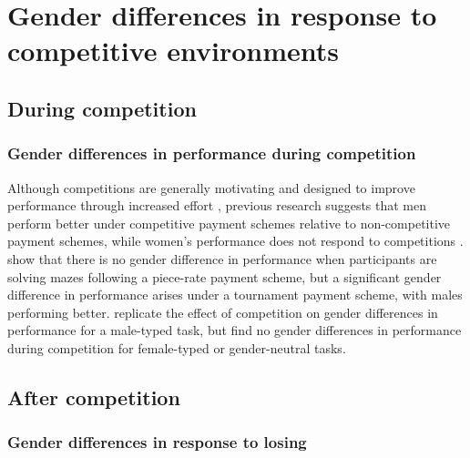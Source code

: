 \documentclass[a4paper, nobind]{templates/ociamthesis}
\begin{document}
\hypertarget{gender-differences-in-response-to-competitive-environments}{%
\section{Gender differences in response to competitive environments}\label{gender-differences-in-response-to-competitive-environments}}

\hypertarget{during-competition}{%
\subsection{During competition}\label{during-competition}}

\hypertarget{gender-differences-in-performance-during-competition}{%
\subsubsection{Gender differences in performance during competition}\label{gender-differences-in-performance-during-competition}}

Although competitions are generally motivating and designed to improve performance through increased effort \autocite{Connelly2014a,Murayama2012,Miller2019a}, previous research suggests that men perform better under competitive payment schemes relative to non-competitive payment schemes, while women's performance does not respond to competitions \autocite{Gneezy2003,Gneezy2004,Gunther2010,Samak2013}. \textcite{Gneezy2003} show that there is no gender difference in performance when participants are solving mazes following a piece-rate payment scheme, but a significant gender difference in performance arises under a tournament payment scheme, with males performing better. \textcite{Gunther2010} replicate the effect of competition on gender differences in performance for a male-typed task, but find no gender differences in performance during competition for female-typed or gender-neutral tasks.

\hypertarget{after-competition}{%
\subsection{After competition}\label{after-competition}}

\hypertarget{gender-differences-in-response-to-losing}{%
\subsubsection{Gender differences in response to losing}\label{gender-differences-in-response-to-losing}}
\end{document}
